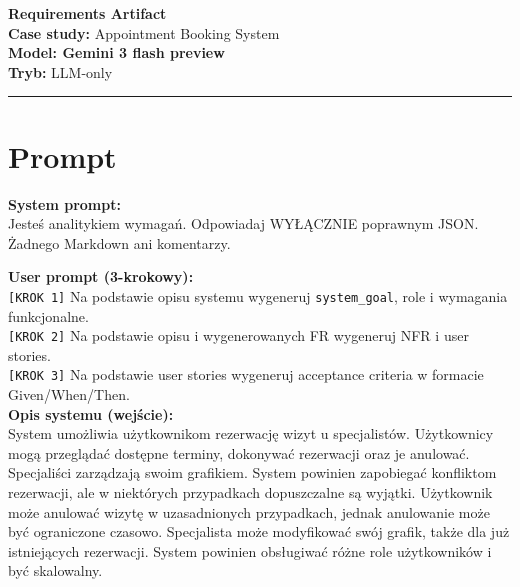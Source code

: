 \documentclass[12pt,a4paper]{article}
\begin{document}
\begin{center}
  {\LARGE\bfseries Requirements Artifact}\\[1.5em]
  {\large \textbf{Case study:} Appointment Booking System}\\[0.3em]
  {\large \textbf{Model: Gemini 3 flash preview}  \quad }\\[0.3em]
  {\large \textbf{Tryb:} LLM-only \quad }\\[0.3em]

\end{center}

\vspace{1em}\hrule\vspace{1.5em}

\section{Prompt}

\begin{mdframed}[backgroundcolor=metabg, linewidth=0pt, innerleftmargin=10pt, innerrightmargin=10pt, innertopmargin=8pt, innerbottommargin=8pt]
\textbf{System prompt:}\\
\small Jesteś analitykiem wymagań. Odpowiadaj WYŁĄCZNIE poprawnym JSON. Żadnego Markdown ani komentarzy.
\end{mdframed}

\vspace{0.5em}
\begin{mdframed}[backgroundcolor=promptbg, linewidth=0pt, innerleftmargin=10pt, innerrightmargin=10pt, innertopmargin=8pt, innerbottommargin=8pt]
\textbf{User prompt (3-krokowy):}\\[0.3em]
\small
\texttt{[KROK 1]} Na podstawie opisu systemu wygeneruj \texttt{system\_goal}, role i wymagania funkcjonalne.\\
\texttt{[KROK 2]} Na podstawie opisu i wygenerowanych FR wygeneruj NFR i user stories.\\
\texttt{[KROK 3]} Na podstawie user stories wygeneruj acceptance criteria w formacie Given/When/Then.\\[0.3em]
\textbf{Opis systemu (wejście):}\\
System umożliwia użytkownikom rezerwację wizyt u specjalistów. Użytkownicy mogą przeglądać dostępne terminy, dokonywać rezerwacji oraz je anulować. Specjaliści zarządzają swoim grafikiem. System powinien zapobiegać konfliktom rezerwacji, ale w niektórych przypadkach dopuszczalne są wyjątki. Użytkownik może anulować wizytę w uzasadnionych przypadkach, jednak anulowanie może być ograniczone czasowo. Specjalista może modyfikować swój grafik, także dla już istniejących rezerwacji. System powinien obsługiwać różne role użytkowników i być skalowalny.
\end{mdframed}
\end{document}
